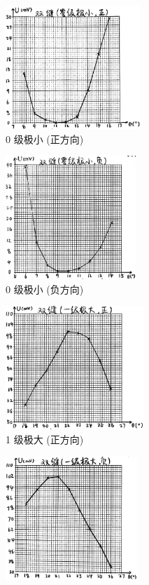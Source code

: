 \documentclass[UTF8]{article}
\theoremstyle{MyLineTheoremStyle} %
\theoremstyle{MyBlockTheoremStyle} %
\theoremstyle{MySubsubsectionStyle} %
\begin{document}
\begin{figure}[H]\centering
\begin{subfigure}[b]{0.5\columnwidth}\centering
    \includegraphics[height=132pt]{assets/2 双缝/双 0小+.png}
    \caption{0 级极小 (正方向)}
\end{subfigure}\hfill
\begin{subfigure}[b]{0.5\columnwidth}\centering
    \includegraphics[height=132pt]{assets/2 双缝/双 0小-.png}
    \caption{0 级极小 (负方向)}
\end{subfigure}
\begin{subfigure}[b]{0.5\columnwidth}\centering
    \includegraphics[height=132pt]{assets/2 双缝/双 1大+.png}
    \caption{1 级极大 (正方向)}
\end{subfigure}\hfill
\begin{subfigure}[b]{0.5\columnwidth}\centering
    \includegraphics[height=132pt]{assets/2 双缝/双 1大-.png}

\end{subfigure}
\end{figure}
\end{document}

